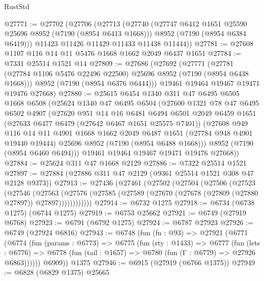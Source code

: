 \begin{lexlean}{RustStd}
\begin{coremodule}
@27771 := @27702
    (@27706
      (@27713
        (@27740
          (@27747 @6412 @1651 @25590 @25696 @8952 (@7190 (@8954 @6413 @1668)))
          @8952
          (@7190 (@8954 @6384 @6419)))
        @11423
        @11426
        @11429
        @11433
        @11438
        @11444))
@27781 := @27608 @1107 @116 @14 @11 @5476 @1668 @1662 @2049 @6437 @1651
@27784 := @7331 @25514 @1521 @14
@27809 := @27686
    (@27692
      (@27771
        (@27781 (@27784 @1106 @5476 @22496 @22500) @25696 @8952 (@7190 (@8954 @6438 @1668)))
        @8952
        (@7190 (@8954 @6376 @6444)))
      @19461
      @19464
      @19467
      @19471
      @19476
      @27668)
@27880 := @25615
    @6454
    @1340
    @311
    @47
    @6495
    @6505
    @1668
    @6508
    (@25624
      @1340
      @47
      @6495
      @6504
      (@27600
        @1321
        @78
        @47
        @6495
        @6502
        @4907
        (@27620
          @951
          @14
          @16
          @6481
          @6494
          @6501
          @2049
          @6459
          @1651
          (@27633 @6477 @6479 (@27642 @6467 @1651 @25575 @7401))
          (@27608
            @949
            @116
            @14
            @11
            @4901
            @1668
            @1662
            @2049
            @6487
            @1651
            (@27784 @948 @4901 @19440 @19444)
            @25696
            @8952
            (@7190 (@8954 @6488 @1668)))
          @8952
          (@7190 (@8954 @6460 @6494)))
        @19461
        @19464
        @19467
        @19471
        @19476
        @27668))
@27884 := @25624 @311 @47 @1668 @2129
@27886 := @7322 @25514 @1521
@27897 := @27884 (@27886 @311 @47 @2129 (@9361 @25514 @1521 @308 @47 @2128 @9373))
@27913 := @27436
    (@27461
      (@27502
        (@27504
          (@27506
            (@27523
              (@27546
                (@27563
                  (@27576
                    (@27585 (@27589 (@27670 (@27678 (@27809 (@27880 @27897)) @27897))))))))))))
@27914 := @6732 @1275
@27918 := @6734 (@6738 @1275) (@6744 @1275)
@27919 := @6753 @25662
@27921 := @6749 (@27919 @6768)
@27923 := @6791 (@6792 @1275)
@27924 := @6787 @27923
@27926 := @6749 (@27924 @6816)
@27943 := @6748
    (fun (fn : @93) =>
    @27921
      (@6771
        (@6774
          (fun (params : @6773) =>
          @6775
            (fun (rty : @1433) =>
            @6777
              (fun (lets : @6776) =>
              @6778 (fun (tail : @1657) => @6780 (fun (Γ : @6779) => @27926 @6863))))))
        @6909))
    @1375
@27946 := @6915 (@27919 (@6766 @1375))
@27949 := @6828 (@6829 @1375) @25665

\end{coremodule}
\end{lexlean}
